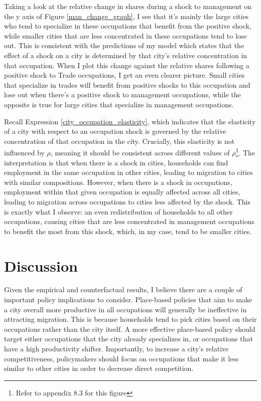 \documentclass[10pt]{article}
\begin{document}
Taking a look at the relative change in shares during a shock to management on the y axis of Figure \ref{man_change_graph}, I see that it's mainly the large cities who tend to specialize in these occupations that benefit from the positive shock, while smaller cities that are less concentrated in these occupations tend to lose out. This is consistent with the predictions of my model which states that the effect of a shock on a city is determined by that city's relative concentration in that occupation. When I plot this change against the relative shares following a positive shock to Trade occupations, I get an even clearer picture. Small cities that specialize in trades will benefit from positive shocks to this occupation and lose out when there's a positive shock to management occupations, while the opposite is true for large cities that specialize in management occupations.

Recall Expression \ref{city_occupation_elasticity}, which indicates that the elasticity of a city with respect to an occupation shock is governed by the relative concentration of that occupation in the city. Crucially, this elasticity is not influenced by $\rho$, meaning it should be consistent across different values of $\rho$\footnote{Refer to appendix 8.3 for this figure}. The interpretation is that when there is a shock in cities, households can find employment in the same occupation in other cities, leading to migration to cities with similar compositions. However, when there is a shock in occupations, employment within that given occupation is equally affected across all cities, leading to migration across occupations to cities less affected by the shock. This is exactly what I observe: an even redistribution of households to all other occupations, causing cities that are less concentrated in management occupations to benefit the most from this shock, which, in my case, tend to be smaller cities.

\section{Discussion}

Given the empirical and counterfactual results, I believe there are a couple of important policy implications to consider. Place-based policies that aim to make a city overall more productive in all occupations will generally be ineffective in attracting migration. This is because households tend to pick cities based on their occupations rather than the city itself. A more effective place-based policy should target either occupations that the city already specializes in, or occupations that have a high productivity shifter. Importantly, to increase a city's relative competitiveness, policymakers should focus on occupations that make it less similar to other cities in order to decrease direct competition.
\end{document}
